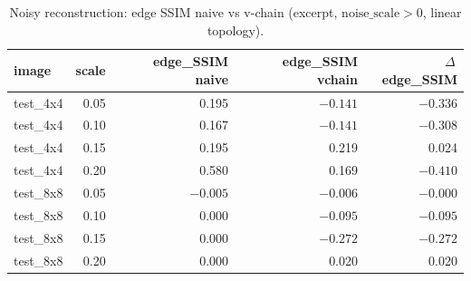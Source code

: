 
\begin{table}[htbp]
\centering
\caption{Noisy reconstruction: edge SSIM naive vs v-chain (excerpt, $\mathrm{noise\_scale}>0$, linear topology).}
\label{tab:noisy_edges_excerpt}
\footnotesize
\begin{tabular}{@{}lrrrr@{}}
\toprule
image & scale & edge\_SSIM naive & edge\_SSIM vchain & $\Delta$\,edge\_SSIM \\
\midrule
test\_4x4 & 0.05 & 0.195 & $-0.141$ & $-0.336$ \\
test\_4x4 & 0.10 & 0.167 & $-0.141$ & $-0.308$ \\
test\_4x4 & 0.15 & 0.195 & 0.219 & 0.024 \\
test\_4x4 & 0.20 & 0.580 & 0.169 & $-0.410$ \\
test\_8x8 & 0.05 & $-0.005$ & $-0.006$ & $-0.000$ \\
test\_8x8 & 0.10 & $0.000$ & $-0.095$ & $-0.095$ \\
test\_8x8 & 0.15 & $0.000$ & $-0.272$ & $-0.272$ \\
test\_8x8 & 0.20 & $0.000$ & 0.020 & 0.020 \\
\bottomrule
\end{tabular}
\end{table}
